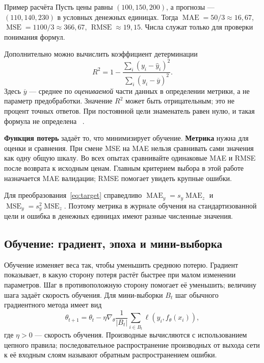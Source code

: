 \begin{keybox}{Пример расчёта}
Пусть цены равны \((100,150,200)\), а прогнозы --- \((110,140,230)\)
в условных денежных единицах. Тогда
\(\operatorname{MAE}=50/3\approx16{,}67\),
\(\operatorname{MSE}=1100/3\approx366{,}67\),
\(\operatorname{RMSE}\approx19{,}15\).
Числа служат только для проверки понимания формул.
\end{keybox}

Дополнительно можно вычислить коэффициент детерминации
\begin{equation}
R^2=1-\frac{\sum_i(y_i-\widehat y_i)^2}
{\sum_i(y_i-\overline y)^2}.
\end{equation}
Здесь \(\overline y\) --- среднее по \textit{оцениваемой} части данных
в определении метрики, а не параметр предобработки.
Значение \(R^2\) может быть отрицательным; это не процент точных ответов.
При постоянной цели знаменатель равен нулю, и такая формула не определена
~\cite{metrics}.

\textbf{Функция потерь} задаёт то, что минимизирует обучение.
\textbf{Метрика} нужна для оценки и сравнения. При смене MSE на MAE
нельзя сравнивать сами значения  как одну общую шкалу.
Во всех опытах сравнивайте одинаковые MAE и RMSE после возврата
к исходным ценам. Главным критерием выбора в этой работе назначается MAE
валидации; RMSE помогает увидеть крупные ошибки.

Для преобразования~\eqref{eq:target} справедливо
\(\operatorname{MAE}_y=s_y\operatorname{MAE}_z\) и
\(\operatorname{MSE}_y=s_y^2\operatorname{MSE}_z\).
Поэтому метрика в журнале обучения на стандартизованной цели и ошибка
в денежных единицах имеют разные численные значения.

\subsection{Обучение: градиент, эпоха и мини-выборка}
Обучение изменяет веса так, чтобы уменьшить среднюю потерю. Градиент
показывает, в какую сторону потеря растёт быстрее при малом изменении
параметров. Шаг в противоположную сторону помогает её уменьшить; величину
шага задаёт скорость обучения.
Для мини-выборки \(B_t\) шаг обычного градиентного метода имеет вид
\begin{equation}
\theta_{t+1}=\theta_t-\eta\nabla_\theta
\frac{1}{|B_t|}\sum_{i\in B_t}\ell(y_i,f_\theta(x_i)),
\end{equation}
где \(\eta>0\) --- скорость обучения. Производные вычисляются с
использованием цепного правила; последовательное распространение
производных от выхода сети к её входным слоям называют обратным
распространением ошибки.

